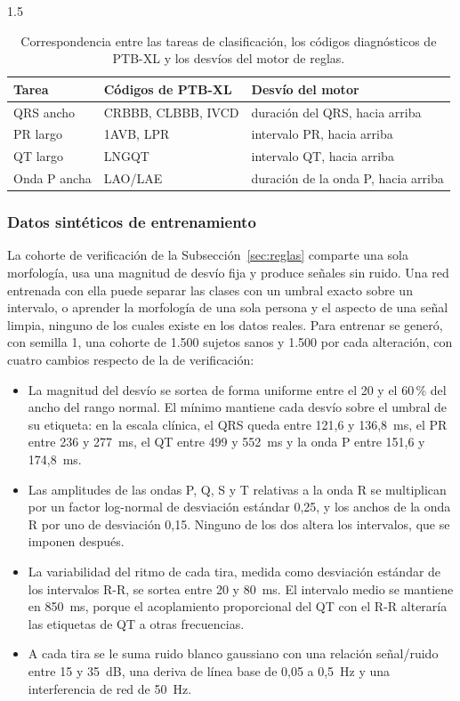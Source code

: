 \begin{spacing}{1.5}
\begin{table}[H]
\centering
\begin{tabular}{|l|l|l|}
\hline
\textbf{Tarea} & \textbf{Códigos de PTB-XL} & \textbf{Desvío del motor} \\ \hline
QRS ancho & CRBBB, CLBBB, IVCD & duración del QRS, hacia arriba \\ \hline
PR largo & 1AVB, LPR & intervalo PR, hacia arriba \\ \hline
QT largo & LNGQT & intervalo QT, hacia arriba \\ \hline
Onda P ancha & LAO/LAE & duración de la onda P, hacia arriba \\ \hline
\end{tabular}
\caption{Correspondencia entre las tareas de clasificación, los códigos diagnósticos de PTB-XL y los desvíos del motor de reglas.}
\label{tab:tareas}
\end{table}

\subsubsection{Datos sintéticos de entrenamiento}

La cohorte de verificación de la Subsección~\ref{sec:reglas} comparte una sola morfología, usa una magnitud de desvío fija y produce señales sin ruido. Una red entrenada con ella puede separar las clases con un umbral exacto sobre un intervalo, o aprender la morfología de una sola persona y el aspecto de una señal limpia, ninguno de los cuales existe en los datos reales. Para entrenar se generó, con semilla 1, una cohorte de 1.500 sujetos sanos y 1.500 por cada alteración, con cuatro cambios respecto de la de verificación:

\begin{itemize}
    \item La magnitud del desvío se sortea de forma uniforme entre el 20 y el 60\,\% del ancho del rango normal. El mínimo mantiene cada desvío sobre el umbral de su etiqueta: en la escala clínica, el QRS queda entre 121,6 y 136,8~ms, el PR entre 236 y 277~ms, el QT entre 499 y 552~ms y la onda P entre 151,6 y 174,8~ms.
    \item Las amplitudes de las ondas P, Q, S y T relativas a la onda R se multiplican por un factor log-normal de desviación estándar 0,25, y los anchos de la onda R por uno de desviación 0,15. Ninguno de los dos altera los intervalos, que se imponen después.
    \item La variabilidad del ritmo de cada tira, medida como desviación estándar de los intervalos R-R, se sortea entre 20 y 80~ms. El intervalo medio se mantiene en 850~ms, porque el acoplamiento proporcional del QT con el R-R alteraría las etiquetas de QT a otras frecuencias.
    \item A cada tira se le suma ruido blanco gaussiano con una relación señal/ruido entre 15 y 35~dB, una deriva de línea base de 0,05 a 0,5~Hz y una interferencia de red de 50~Hz.
\end{itemize}


\end{spacing}
